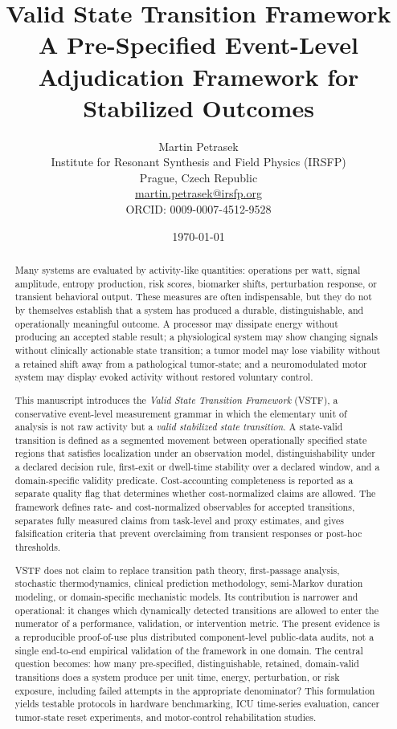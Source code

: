 \documentclass[11pt,a4paper]{article}
\title{\textbf{Valid State Transition Framework}\\
\large A Pre-Specified Event-Level Adjudication Framework for Stabilized Outcomes}
\author{Martin Petrasek\\
Institute for Resonant Synthesis and Field Physics (IRSFP)\\
Prague, Czech Republic\\
\href{mailto:martin.petrasek@irsfp.org}{martin.petrasek@irsfp.org}\\
ORCID: 0009-0007-4512-9528}
\date{\today}
\newcommand{\1}{\mathbf{1}}
\begin{document}
\maketitle

\begin{abstract}
Many systems are evaluated by activity-like quantities: operations per watt, signal amplitude, entropy production, risk scores, biomarker shifts, perturbation response, or transient behavioral output. These measures are often indispensable, but they do not by themselves establish that a system has produced a durable, distinguishable, and operationally meaningful outcome. A processor may dissipate energy without producing an accepted stable result; a physiological system may show changing signals without clinically actionable state transition; a tumor model may lose viability without a retained shift away from a pathological tumor-state; and a neuromodulated motor system may display evoked activity without restored voluntary control.

This manuscript introduces the \emph{Valid State Transition Framework} (VSTF), a conservative event-level measurement grammar in which the elementary unit of analysis is not raw activity but a \emph{valid stabilized state transition}. A state-valid transition is defined as a segmented movement between operationally specified state regions that satisfies localization under an observation model, distinguishability under a declared decision rule, first-exit or dwell-time stability over a declared window, and a domain-specific validity predicate. Cost-accounting completeness is reported as a separate quality flag that determines whether cost-normalized claims are allowed. The framework defines rate- and cost-normalized observables for accepted transitions, separates fully measured claims from task-level and proxy estimates, and gives falsification criteria that prevent overclaiming from transient responses or post-hoc thresholds.

VSTF does not claim to replace transition path theory, first-passage analysis, stochastic thermodynamics, clinical prediction methodology, semi-Markov duration modeling, or domain-specific mechanistic models. Its contribution is narrower and operational: it changes which dynamically detected transitions are allowed to enter the numerator of a performance, validation, or intervention metric. The present evidence is a reproducible proof-of-use plus distributed component-level public-data audits, not a single end-to-end empirical validation of the framework in one domain. The central question becomes: how many pre-specified, distinguishable, retained, domain-valid transitions does a system produce per unit time, energy, perturbation, or risk exposure, including failed attempts in the appropriate denominator? This formulation yields testable protocols in hardware benchmarking, ICU time-series evaluation, cancer tumor-state reset experiments, and motor-control rehabilitation studies.
\end{abstract}
\end{document}
